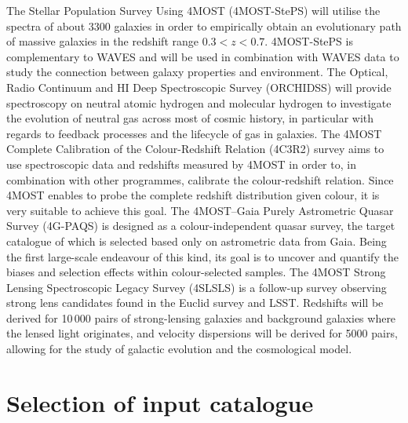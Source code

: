 \documentclass[a4paper,11pt]{article}
\begin{document}
The Stellar Population Survey Using 4MOST (4MOST-StePS) \citep{4moststeps} will utilise the spectra of about 3300 galaxies in order to empirically obtain an evolutionary path of massive galaxies in the redshift range $0.3<z<0.7$. 4MOST-StePS is complementary to WAVES and will be used in combination with WAVES data to study the connection between galaxy properties and environment. The Optical, Radio Continuum and HI Deep Spectroscopic Survey (ORCHIDSS) \citep{orchidss} will provide spectroscopy on neutral atomic hydrogen and molecular hydrogen to investigate the evolution of neutral gas across most of cosmic history, in particular with regards to feedback processes and the lifecycle of gas in galaxies. The 4MOST Complete Calibration of the Colour-Redshift Relation (4C3R2) survey \citep{4c3r2} aims to use spectroscopic data and redshifts measured by 4MOST in order to, in combination with other programmes, calibrate the colour-redshift relation. Since 4MOST enables to probe the complete redshift distribution given colour, it is very suitable to achieve this goal. The 4MOST–Gaia Purely Astrometric Quasar Survey (4G-PAQS) \citep{4gpaqs} is designed as a colour-independent quasar survey, the target catalogue of which is selected based only on astrometric data from Gaia. Being the first large-scale endeavour of this kind, its goal is to uncover and quantify the biases and selection effects within colour-selected samples. The 4MOST Strong Lensing Spectroscopic Legacy Survey (4SLSLS) \citep{4slsls} is a follow-up survey observing strong lens candidates found in the Euclid survey and LSST. Redshifts will be derived for 10\,000 pairs of strong-lensing galaxies and background galaxies where the lensed light originates, and velocity dispersions will be derived for 5000 pairs, allowing for the study of galactic evolution and the cosmological model.
%
%
%
%
%
\clearpage
\section{Selection of input catalogue} \label{selection}
\end{document}
